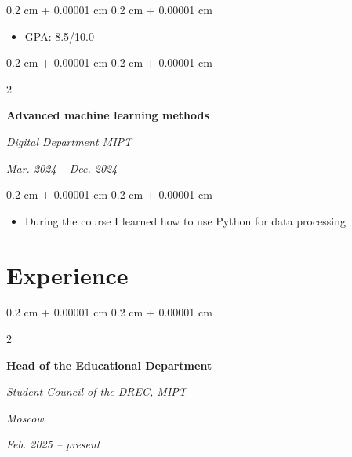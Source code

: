 \documentclass[10pt, letterpaper]{article}
\newenvironment{highlights}{
    \begin{itemize}[
        topsep=0.10 cm,
        parsep=0.10 cm,
        partopsep=0pt,
        itemsep=0pt,
        leftmargin=0.4 cm + 10pt
    ]
}{
    \end{itemize}
} %
\newenvironment{onecolentry}{
    \begin{adjustwidth}{
        0.2 cm + 0.00001 cm
    }{
        0.2 cm + 0.00001 cm
    }
}{
    \end{adjustwidth}
} %
\newenvironment{twocolentry}[2][]{
    \onecolentry
    \def\secondColumn{#2}
    \setcolumnwidth{\fill, 4.5 cm}
    \begin{paracol}{2}
}{
    \switchcolumn \raggedleft \secondColumn
    \end{paracol}
    \endonecolentry
} %
\let\hrefWithoutArrow\href
\renewcommand{\href}[2]{\hrefWithoutArrow{#1}{\ifthenelse{\equal{#2}{}}{ }{#2 }\raisebox{.15ex}{\footnotesize \faExternalLink*}}}
\begin{document}
        \vspace{0.10 cm}
        \begin{onecolentry}
            \begin{highlights}
                \item GPA: 8.5/10.0 
            \end{highlights}
        \end{onecolentry}

        \vspace{0.2 cm}

        \begin{twocolentry}{
            \textit{Mar. 2024 – Dec. 2024}}
            \textbf{Advanced machine learning methods}

            \textit{Digital Department MIPT}
        \end{twocolentry}
    
            \vspace{0.10 cm}
            \begin{onecolentry}
                \begin{highlights}
                    \item During the course I learned how to use Python for data processing
                \end{highlights}
            \end{onecolentry}

    
    \section{Experience}

        \begin{twocolentry}
        {
            \textit{Moscow}   

            \textit{Feb. 2025 – present}
        }
            \textbf{Head of the Educational Department}
            
            \textit{Student Council of the DREC, MIPT}
        \end{twocolentry}
\end{document}
